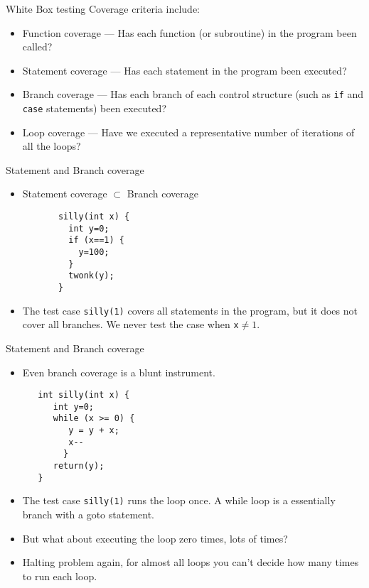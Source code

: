 \documentclass[handout]{beamer}
\begin{document}
\begin{frame}{White Box testing}
Coverage criteria include:
  \begin{itemize}
  \item Function coverage --- Has each function (or subroutine) in the
    program been called?
  \item Statement coverage --- Has each statement in the program been
    executed?  
  \item Branch coverage --- Has each branch of each control structure
    (such as {\tt if} and {\tt case} statements) been executed?
  \item Loop coverage --- Have we executed a representative number of iterations
    of all the loops? 
  \end{itemize}
\end{frame}

\begin{frame}[fragile]{Statement and Branch coverage}

\begin{itemize}
\item Statement coverage $\subset$ Branch coverage
\begin{lstlisting}
       silly(int x) {
         int y=0;
         if (x==1) {
           y=100;
         }
         twonk(y);
       }
\end{lstlisting}

  \item  The test case {\tt silly(1)} covers all statements in the program, but
  it does not cover all branches. We never test the case when {\tt x}$\neq1$.
\end{itemize}
\end{frame}

\begin{frame}[fragile]{Statement and Branch coverage}
\begin{itemize}
 \item Even branch coverage is a blunt instrument.
\begin{lstlisting}
   int silly(int x) { 
      int y=0;
      while (x >= 0) {
         y = y + x;
         x--
        }
      return(y);
   }
\end{lstlisting}
  \item The test case {\tt silly(1)} runs the loop once. A while loop is a
    essentially branch with a goto statement. 
  \item But what about executing the loop zero times, lots of times?
   \item Halting problem again, for almost all loops you can't
     decide how many times to run each loop.
\end{itemize}
    
\end{frame}
\end{document}
